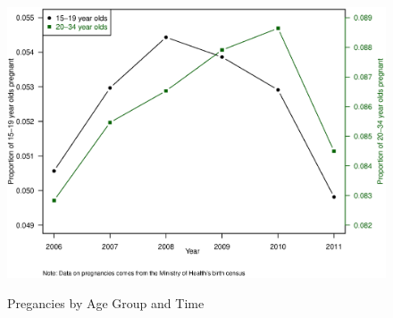 \documentclass[11pt,subeqn]{article}
\renewcommand\thesection{\Alph{section}}
\begin{document}
\begin{spacing}{1.4}
\begin{figure}[htpb!]
\begin{center}
\caption{Pregancies by Age Group and Time}
\vspace{-5mm}
\label{TEENfig:Pregtime}
\includegraphics[scale=0.54]{../Figures/Births.eps} 
\end{center}
\end{figure}


\clearpage
\renewcommand\thesection{\Alph{section}}
\setlength\parindent{0.25in}
\setlength\parskip{0.25in}


\end{spacing}
\end{document}
